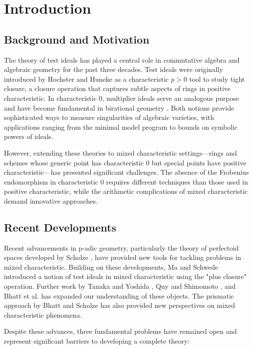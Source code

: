 \section{Introduction}

\subsection{Background and Motivation}

The theory of test ideals has played a central role in commutative algebra and algebraic geometry for the past three decades. Test ideals were originally introduced by Hochster and Huneke \cite{HH90} as a characteristic $p > 0$ tool to study tight closure, a closure operation that captures subtle aspects of rings in positive characteristic. In characteristic 0, multiplier ideals serve an analogous purpose and have become fundamental in birational geometry \cite{Laz04}. Both notions provide sophisticated ways to measure singularities of algebraic varieties, with applications ranging from the minimal model program to bounds on symbolic powers of ideals.

However, extending these theories to mixed characteristic settings—rings and schemes whose generic point has characteristic 0 but special points have positive characteristic—has presented significant challenges. The absence of the Frobenius endomorphism in characteristic 0 requires different techniques than those used in positive characteristic, while the arithmetic complications of mixed characteristic demand innovative approaches.

\subsection{Recent Developments}

Recent advancements in p-adic geometry, particularly the theory of perfectoid spaces developed by Scholze \cite{Sch12}, have provided new tools for tackling problems in mixed characteristic. Building on these developments, Ma and Schwede \cite{MS18} introduced a notion of test ideals in mixed characteristic using the "plus closure" operation. Further work by Tanaka and Yoshida \cite{TY21}, Quy and Shimomoto \cite{QS17}, and Bhatt et al. \cite{BMP+23} has expanded our understanding of these objects. The prismatic approach by Bhatt and Scholze \cite{BS19, BS22} has also provided new perspectives on mixed characteristic phenomena.

Despite these advances, three fundamental problems have remained open and represent significant barriers to developing a complete theory:

